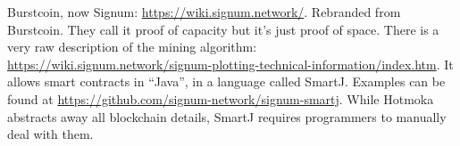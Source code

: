 
Burstcoin, now Signum: \url{https://wiki.signum.network/}. Rebranded from Burstcoin.
They call it proof of capacity but it's just proof of space.
There is a very raw description of the mining algorithm:
\url{https://wiki.signum.network/signum-plotting-technical-information/index.htm}.
It allows smart contracts in ``Java'', in a language called SmartJ. Examples
can be found at \url{https://github.com/signum-network/signum-smartj}.
While Hotmoka abstracts away all blockchain details, SmartJ requires programmers to
manually deal with them.
